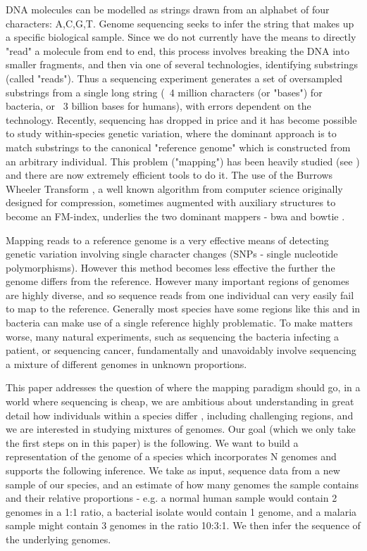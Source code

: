 \documentclass[runningheads,a4paper]{llncs}
\begin{document}
DNA molecules can be modelled as strings drawn from an alphabet of four characters: A,C,G,T. Genome sequencing seeks to infer the string that makes up a specific biological sample. Since we do not currently have the means to directly "read"  a molecule from end to end, this process involves breaking the DNA into smaller fragments, and then via one of several technologies, identifying substrings (called "reads"). Thus a sequencing experiment generates a set of oversampled substrings from a single long string (~4 million characters (or "bases") for bacteria, or ~3 billion bases for humans), with errors dependent on the technology. Recently, sequencing has dropped in price and it has become possible to study within-species genetic variation, where the dominant approach is to match substrings to the canonical "reference genome" which is constructed from an arbitrary individual.  This problem ("mapping") has been heavily studied  (see \cite{reinert}) and there are now extremely efficient tools to do it. The use of the Burrows Wheeler Transform \cite{bwt}, a well known algorithm from computer science originally designed for compression, sometimes augmented with auxiliary structures to become an FM-index, underlies the two dominant mappers - bwa \cite{bwa}and bowtie \cite{bowtie}.

Mapping reads to a reference genome is a very effective means of detecting genetic variation involving single character changes (SNPs - single nucleotide polymorphisms). However this method becomes less effective the further the genome differs from the reference. However many important regions of genomes are highly diverse, and so sequence reads from one individual can very easily fail to map to the reference. Generally most species have some regions like this and in bacteria can make use of a single reference highly problematic. To make matters worse, many natural experiments, such as sequencing the bacteria infecting a patient,  or sequencing cancer,  fundamentally and unavoidably involve sequencing a mixture of different genomes in unknown proportions. 

This paper addresses the question of where the mapping paradigm should go, in a world where sequencing is cheap,  we are ambitious about understanding in great detail how individuals within a species differ \cite{1000g,arabi,pombe}, including challenging regions, and we are interested in studying mixtures of genomes.  Our goal (which we only take the first steps on in this paper) is the following. We want to build a representation of the genome of a species which incorporates N genomes and supports the following inference. We take as input, sequence data from a new sample of our species, and  an estimate of how many genomes the sample contains and their relative proportions - e.g. a normal human sample would contain 2 genomes in a 1:1 ratio, a bacterial isolate would contain 1 genome, and a malaria sample might contain 3 genomes in the ratio 10:3:1. We then infer the sequence of the underlying genomes. 
\end{document}
